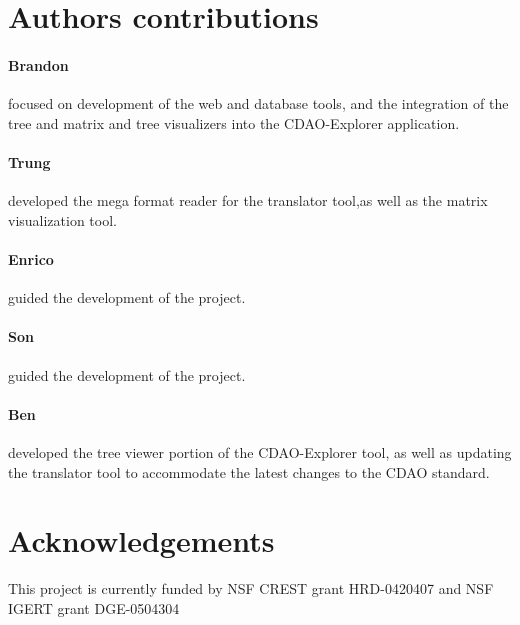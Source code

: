 \documentclass[10pt]{bmc_article}
\newenvironment{bmcformat}{\fussy\setboolean{publ}{true}}{\fussy}
\begin{document}
\begin{bmcformat}
    
\section*{Authors contributions}
    \paragraph*{Brandon} focused on development of the web and database tools, and the integration of the tree and matrix
      and tree visualizers into the CDAO-Explorer application. 
    \paragraph*{Trung} developed the mega format reader for the translator tool,as well as the matrix visualization tool. 
    \paragraph*{Enrico} guided the development of the project. 
    \paragraph*{Son} guided the development of the project.
    \paragraph*{Ben} developed the tree viewer portion of the CDAO-Explorer tool, as well as updating the translator tool to
       accommodate the latest changes to the CDAO standard. 
    

\section*{Acknowledgements}
  This project is currently funded by NSF CREST grant HRD-0420407 and NSF IGERT grant DGE-0504304


 



\end{bmcformat}
\end{document}
